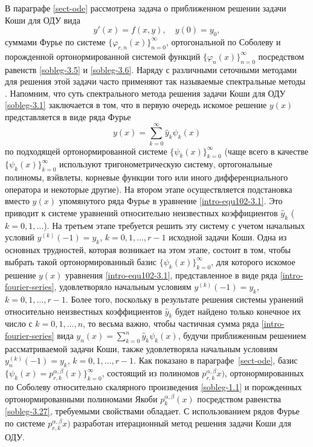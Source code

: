 В параграфе \ref{sect-ode} рассмотрена задача о приближенном решении задачи Коши для ОДУ вида
\begin{equation}\label{intro-equ102-3.1}
y'(x)=f(x,y), \quad y(0)=y_0,
\end{equation}
суммами Фурье по системе $\{\varphi_{r,n}(x)\}_{n=0}^\infty$, ортогональной по Соболеву и порожденной ортонормированной системой функций $\{\varphi_{n}(x)\}_{n=0}^\infty$ посредством равенств \eqref{sobleg-3.5} и \eqref{sobleg-3.6}.
Наряду с различными сеточными методами для решения этой задачи часто применяют так называемые спектральные методы \cite{sobleg-Tref1, sobleg-Tref2, sobleg-SolDmEg, sobleg-Pash, sobleg-MMG2016}. Напомним, что суть спектрального метода решения задачи Коши  для ОДУ \eqref{sobleg-3.1} заключается в том, что в первую очередь искомое решение $y(x)$ представляется в виде ряда Фурье 
\begin{equation}\label{intro-fourier-series}
y(x)=\sum_{k=0}^\infty \hat y_k\psi_k(x)
\end{equation}
по подходящей ортонормированной системе $\{\psi_k(x)\}_{k=0}^\infty$ (чаще всего в качестве $\{\psi_k(x)\}_{k=0}^\infty$ используют    тригонометрическую систему, ортогональные полиномы, вэйвлеты, корневые функции того или иного дифференциального оператора  и некоторые другие). На втором этапе осуществляется подстановка вместо $y(x)$ упомянутого ряда Фурье в уравнение \eqref{intro-equ102-3.1}. Это приводит к системе уравнений относительно неизвестных коэффициентов $\hat y_k$ ($k=0,1,\ldots$). На третьем этапе требуется решить эту систему с учетом начальных условий  $y^{(k)}(-1)=y_k$, $k=0,1,\ldots, r-1$ исходной задачи Коши.
Одна из основных трудностей, которая возникает на этом этапе, состоит в том, чтобы
выбрать такой ортонормированный базис $\{\psi_k(x)\}_{k=0}^\infty$, для которого искомое решение $y(x)$ уравнения \eqref{intro-equ102-3.1}, представленное в виде ряда  \eqref{intro-fourier-series}, удовлетворяло начальным условиям $y^{(k)}(-1)=y_k$, $k=0,1,\ldots,r-1$. Более того, поскольку в результате решения системы уранений относительно неизвестных коэффициентов $\hat y_k$  будет найдено только конечное их число с $k=0,1,\ldots, n$, то весьма важно, чтобы частичная сумма ряда \eqref{intro-fourier-series} вида
$ y_n(x)=\sum_{k=0}^n\hat y_k\psi_k(x)$, будучи приближенным решением рассматриваемой задачи Коши, также удовлетворяла  начальным условиям $y_n^{(k)}(-1)=y_k$, $k=0,1,\ldots,r-1$. Как показано в параграфе~\ref{sect-ode}, базис $\{\psi_k(x)=p_{r,k}^{\alpha,\beta}(x)\}_{k=0}^\infty$, состоящий из полиномов
$p_{r,k}^{\alpha,\beta}x)$, ортонормированных по Соболеву относительно скалярного произведения \eqref{sobleg-1.1} и порожденных ортонормированными полиномами Якоби $p_k^{\alpha,\beta}(x)$  посредством равенства \eqref{sobleg-3.27}, требуемыми свойствами обладает. С использованием рядов Фурье по системе $p_{r,k}^{\alpha,\beta}x)$ разработан итерационный метод решения задачи Коши для ОДУ.
